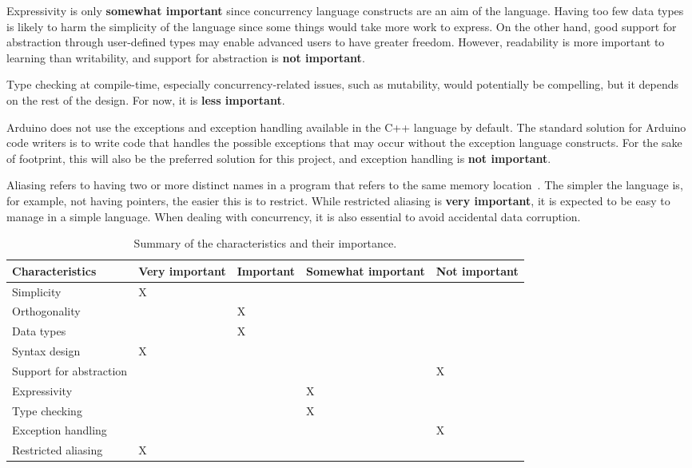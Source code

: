 Expressivity is only \textbf{somewhat important} since concurrency language constructs are an aim of the language. Having too few data types is likely to harm the simplicity of the language since some things would take more work to express. On the other hand, good support for abstraction through user-defined types may enable advanced users to have greater freedom. However, readability is more important to learning than writability, and support for abstraction is \textbf{not important}.

Type checking at compile-time, especially concurrency-related issues, such as mutability, would potentially be compelling, but it depends on the rest of the design. For now, it is \textbf{less important}.

Arduino does not use the exceptions and exception handling available in the C++ language by default. The standard solution for Arduino code writers is to write code that handles the possible exceptions that may occur without the exception language constructs. For the sake of footprint, this will also be the preferred solution for this project, and exception handling is \textbf{not important}.

Aliasing refers to having two or more distinct names in a program that refers to the same memory location~\cite{Sebesta2016}. The simpler the language is, for example, not having pointers, the easier this is to restrict. While restricted aliasing is \textbf{very important}, it is expected to be easy to manage in a simple language. When dealing with concurrency, it is also essential to avoid accidental data corruption.


\begin{table}[htb]
    \centering
    \begin{tabular}{l>{\centering}p{2cm}>{\centering}p{2cm}>{\centering}p{2cm}>{\centering\arraybackslash}p{2cm}}
        \toprule
        \textbf{Characteristics}    &
        \textbf{Very important}     &
        \textbf{Important}          &
        \textbf{Somewhat important} &
        \textbf{Not important}                      \\ \midrule
        Simplicity                  & X &   &   &   \\
        Orthogonality               &   & X &   &   \\
        Data types                  &   & X &   &   \\
        Syntax design               & X &   &   &   \\
        Support for abstraction     &   &   &   & X \\
        Expressivity                &   &   & X &   \\
        Type checking               &   &   & X &   \\
        Exception handling          &   &   &   & X \\
        Restricted aliasing         & X &   &   &   \\
        \bottomrule
    \end{tabular}
    \caption{Summary of the characteristics and their importance.}
    \label{tab:priorityofcharacteristics}
\end{table}



